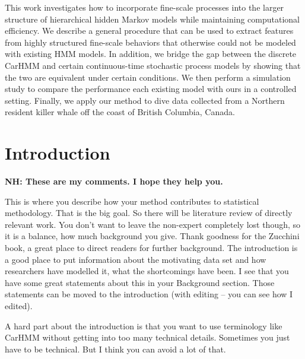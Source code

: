 This work investigates how to incorporate fine-scale processes into the larger structure of hierarchical hidden Markov models while maintaining computational efficiency. We describe a general procedure that can be used to extract features from highly structured fine-scale behaviors that otherwise could not be modeled with existing HMM models. In addition, we bridge the gap between the discrete CarHMM and certain continuous-time stochastic process models by showing that the two are equivalent under certain conditions. We then perform a simulation study to compare the performance each existing model with ours in a controlled setting. Finally, we apply our method to dive data collected from a Northern resident killer whale off the coast of British Columbia, Canada.



\iffalse

\section{Introduction}

{\bf{NH: These are my comments.  I hope they help you.}}

This is where you describe how your method contributes to statistical methodology. That is the big goal.  So there will be literature review of directly relevant work.  You don't want to leave the non-expert completely lost though, so it is a balance, how much background you give.
Thank goodness for the Zucchini book, a great place to direct readers for further background.  
The introduction is a good place to put information about the motivating data set and how researchers have modelled it, what the shortcomings have been.  I see that you have some great statements about this in your Background section.  Those statements can be moved to the introduction (with editing -- you can see how I edited).

A hard part about the introduction is that you want to use terminology like CarHMM without getting into too many technical details.  Sometimes you just have to be technical.  But I think you can avoid a lot of that.

